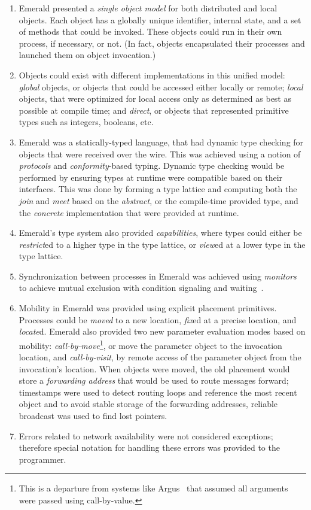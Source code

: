 \begin{enumerate}
\item Emerald presented a \textit{single object model} for both distributed and local objects.  Each object has a globally unique identifier, internal state, and a set of methods that could be invoked.  These objects could run in their own process, if necessary, or not.  (In fact, objects encapsulated their processes and launched them on object invocation.)
\item Objects could exist with different implementations in this unified model: \textit{global} objects, or objects that could be accessed either locally or remote; \textit{local} objects, that were optimized for local access only as determined as best as possible at compile time; and \textit{direct}, or objects that represented primitive types such as integers, booleans, etc.
\item Emerald was a statically-typed language, that had dynamic type checking for objects that were received over the wire.  This was achieved using a notion of \textit{protocols} and \textit{conformity}-based typing.  Dynamic type checking would be performed by ensuring types at runtime were compatible based on their interfaces.  This was done by forming a type lattice and computing both the \textit{join} and \textit{meet} based on the \textit{abstract}, or the compile-time provided type, and the \textit{concrete} implementation that were provided at runtime.
\item Emerald's type system also provided \textit{capabilities}, where types could either be \textit{restrict}ed to a higher type in the type lattice, or \textit{view}ed at a lower type in the type lattice.
\item Synchronization between processes in Emerald was achieved using \textit{monitors} to achieve mutual exclusion with condition signaling and waiting~\cite{hoare1974monitors}.
\item Mobility in Emerald was provided using explicit placement primitives.  Processes could be \textit{moved} to a new location, \textit{fix}ed at a precise location, and \textit{locate}d.  Emerald also provided two new parameter evaluation modes based on mobility: \textit{call-by-move}\footnote{This is a departure from systems like Argus~\cite{liskov1988distributed} that assumed all arguments were passed using call-by-value.}, or move the parameter object to the invocation location, and \textit{call-by-visit}, by remote access of the parameter object from the invocation's location.  When objects were moved, the old placement would store a \textit{forwarding address} that would be used to route messages forward; timestamps were used to detect routing loops and reference the most recent object and to avoid stable storage of the forwarding addresses, reliable broadcast was used to find lost pointers.
\item Errors related to network availability were not considered exceptions; therefore special notation for handling these errors was provided to the programmer.
\end{enumerate}

